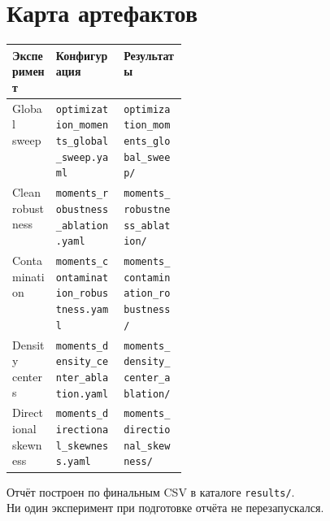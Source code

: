 \documentclass[11pt,a4paper]{article}
\newcommand{\code}[1]{{\footnotesize\nolinkurl{#1}}}
\newcommand{\configlink}[1]{%
  \code{#1.yaml}}
\newcommand{\resultslink}[1]{%
  \code{#1/}}
\begin{document}
\section{Карта артефактов}

\begin{center}
\small
\begin{tabularx}{\linewidth}{@{}p{0.25\linewidth}Y Y@{}}
\toprule
{}
\textbf{Эксперимент} & \textbf{Конфигурация} & \textbf{Результаты}\\
\midrule
Global sweep &
\configlink{optimization_moments_global_sweep} &
\resultslink{optimization_moments_global_sweep}\\
Clean robustness &
\configlink{moments_robustness_ablation} &
\resultslink{moments_robustness_ablation}\\
Contamination &
\configlink{moments_contamination_robustness} &
\resultslink{moments_contamination_robustness}\\
Density centers &
\configlink{moments_density_center_ablation} &
\resultslink{moments_density_center_ablation}\\
Directional skewness &
\configlink{moments_directional_skewness} &
\resultslink{moments_directional_skewness}\\
\bottomrule
\end{tabularx}
\end{center}

\vfill
\begin{center}
\small\color{midgray}
Отчёт построен по финальным CSV в каталоге \code{results/}.\\
Ни один эксперимент при подготовке отчёта не перезапускался.
\end{center}
\end{document}
